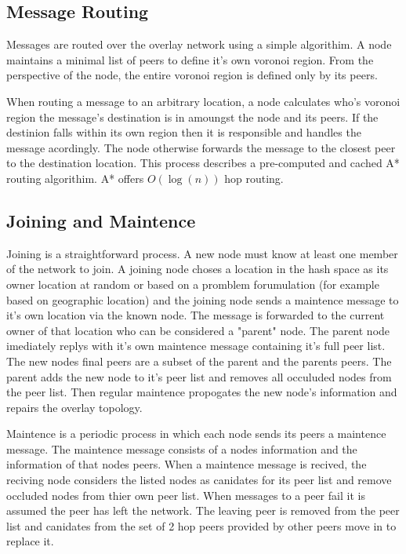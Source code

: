 \documentclass[11pt]{IEEEtran} %
\begin{document}
\subsection{Message Routing}
Messages are routed over the overlay network using a simple algorithim. A node maintains a minimal list of peers to define it's own voronoi region.  From the perspective of the node, the entire voronoi region is defined only by its peers.

When routing a message to an arbitrary location, a node calculates who's voronoi region the message's destination is in amoungst the node and its peers. If the destinion falls within its own region then it is responsible and handles the message acordingly. The node otherwise forwards the message to the closest peer to the destination location. This process describes a pre-computed and cached A* \cite{astar} routing algorithim. A* offers $O(\log(n))$ hop routing.




\subsection{Joining and Maintence}
Joining is a straightforward process. A new node must know at least one member of the network to join. A joining node choses a location in the hash space as its owner location at random or based on a promblem forumulation (for example based on geographic location) and the joining node sends a maintence message to it's own location via the known node. The message is forwarded to the current owner of that location who can be considered a "parent" node. The parent node imediately replys with it's own maintence message containing it's full peer list. The new nodes final peers are a subset of the parent and the parents peers. The parent adds the new node to it's peer list and removes all occuluded nodes from the peer list. Then regular maintence propogates the new node's information and repairs the overlay topology.

Maintence is a periodic process in which each node sends its peers a maintence message. The maintence message consists of a nodes information and the information of that nodes peers. When a maintence message is recived, the reciving node considers the listed nodes as canidates for its peer list and remove occluded nodes from thier own peer list. When messages to a peer fail it is assumed the peer has left the network. The leaving peer is removed from the peer list and canidates from the set of 2 hop peers provided by other peers move in to replace it.
\end{document}
